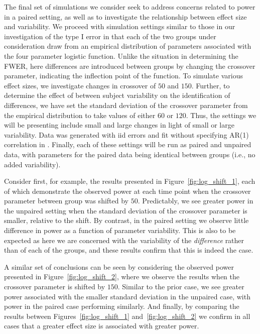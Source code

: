 
The final set of simulations we consider seek to address concerns related to power in a paired setting, as well as to investigate the relationship between effect size and variability. We proceed with simulation settings similar to those in our investigation of the type I error in that each of the two groups under consideration draw from an empirical distribution of parameters associated with the four parameter logistic function. Unlike the situation in determining the FWER, here differences are introduced between groups by changing the crossover parameter, indicating the inflection point of the function. To simulate various effect sizes, we investigate changes in crossover of $50$ and $150$. Further, to determine the effect of between subject variability on the identification of differences, we have set the standard deviation of the crossover parameter from the empirical distribution to take values of either $60$ or $120$. Thus, the settings we will be presenting include small and large changes in light of small or large variability. Data was generated with iid errors and fit without specifying AR(1) correlation in . Finally, each of these settings will be run as paired and unpaired data, with parameters for the paired data being identical between groups (i.e., no added variability). 


Consider first, for example, the results presented in Figure~\ref{fig:log_shift_1}, each of which demonstrate the observed power at each time point when the crossover parameter between group was shifted by $50$. Predictably, we see greater power in the unpaired setting when the standard deviation of the crossover parameter is smaller, relative to the shift. By contrast, in the paired setting we observe little difference in power as a function of parameter variability. This is also to be expected as here we are concerned with the variability of the \textit{difference} rather than of each of the groups, and these results confirm that this is indeed the case. 


A similar set of conclusions can be seen by considering the observed power presented in Figure~\ref{fig:log_shift_2}, where we observe the results when the crossover parameter is shifted by $150$. Similar to the prior case, we see greater power associated with the smaller standard deviation in the unpaired case, with power in the paired case performing similarly. And finally, by comparing the results between Figures~\ref{fig:log_shift_1} and~\ref{fig:log_shift_2} we confirm in all cases that a greater effect size is associated with greater power. 

